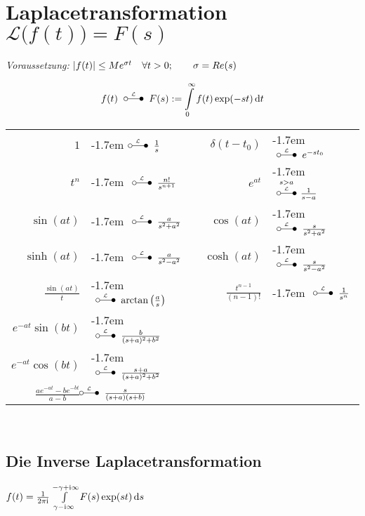 \documentclass[german,color,5pt]{latex4ei/latex4ei_fs}
\begin{document}
\section{Laplacetransformation \quad $\mathcal L\bigl(f(t)\bigr) = F(s)$}
\begin{sectionbox}
	\emph{Voraussetzung:} $\left\vert f(t)\right\vert \leq M e^{\sigma t} \quad \forall t > 0; \qquad \sigma = Re(s)$
	\begin{emphbox}\vspace{-5pt}
		\[f(t) \LT F(s) := \int\limits_0^\infty f(t) \exp(-st) \diff t\]
	\end{emphbox}
	\begin{tabular}{rlrl}
		$1$ & \kern-1.7em$\LT \frac{1}{s}$ & $\delta(t-t_0)$ & \kern-1.7em $\LT e^{-s t_0}$\\[0.2em]
		$t^n$ & \kern-1.7em $\LT \frac{n!}{s^{n+1}}$ & $e^{at}$  & \kern-1.7em $\overset{s > a}{ \LT } \frac{1}{s-a}$\\[0.5em] 
		$\sin(a t)$ & \kern-1.7em $\LT \frac{a}{s^2 + a^2}$ & $\cos(a t)$ & \kern-1.7em $\LT \frac{s}{s^2 + a^2}$\\[0.5em]
		$\sinh(a t)$ & \kern-1.7em $\LT \frac{a}{s^2 - a^2}$ & $\cosh(a t)$ & \kern-1.7em $\LT \frac{s}{s^2 - a^2}$\\[0.5em]
		$\frac{\sin(at)}{t}$ & \kern-1.7em $\LT\arctan\left(\frac{a}{s}\right)$	& $\frac{t^{n-1}}{(n-1)!}$   & \kern-1.7em $\LT \frac{1}{s^n}$ \\[0.5em]
		$e^{-at} \sin(b t)$ & \kern-1.7em $\LT \frac{b}{(s+a)^2+b^2}$ \\
		$e^{-at} \cos(b t)$ & \kern-1.7em $\LT \frac{s+a}{(s+a)^2+b^2}$\\
		$\frac{ae^{-at}-be^{-bt}}{a-b}$ & $\kern-1.7em \LT \frac{s}{(s+a)(s+b)}$
	\end{tabular}\\
	\subsection{Die Inverse Laplacetransformation}
	$f(t) = \frac{1}{2\pi \i} \int\limits_{\gamma - \i \infty}^{-\gamma + \i \infty} F(s) \exp(st) \diff s$
\end{sectionbox}
\end{document}
